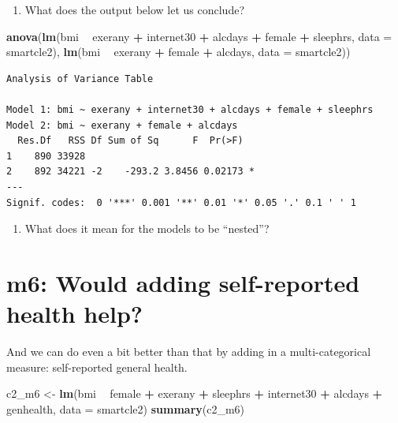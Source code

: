 \documentclass[]{book}
\newenvironment{Shaded}{\begin{snugshade}}{\end{snugshade}}
\newcommand{\KeywordTok}[1]{\textcolor[rgb]{0.13,0.29,0.53}{\textbf{#1}}}
\newcommand{\DataTypeTok}[1]{\textcolor[rgb]{0.13,0.29,0.53}{#1}}
\newcommand{\StringTok}[1]{\textcolor[rgb]{0.31,0.60,0.02}{#1}}
\newcommand{\OperatorTok}[1]{\textcolor[rgb]{0.81,0.36,0.00}{\textbf{#1}}}
\newcommand{\NormalTok}[1]{#1}
\providecommand{\tightlist}{%
  \setlength{\itemsep}{0pt}\setlength{\parskip}{0pt}}
\theoremstyle{definition}
\theoremstyle{definition}
\theoremstyle{definition}
\theoremstyle{remark}
\begin{document}
\begin{enumerate}
\def\labelenumi{\arabic{enumi}.}
\setcounter{enumi}{2}
\tightlist
\item
  What does the output below let us conclude?
\end{enumerate}

\begin{Shaded}
\begin{Highlighting}[]
\KeywordTok{anova}\NormalTok{(}\KeywordTok{lm}\NormalTok{(bmi }\OperatorTok{~}\StringTok{ }\NormalTok{exerany }\OperatorTok{+}\StringTok{ }\NormalTok{internet30 }\OperatorTok{+}\StringTok{ }\NormalTok{alcdays }\OperatorTok{+}\StringTok{ }\NormalTok{female }\OperatorTok{+}\StringTok{ }\NormalTok{sleephrs, }
         \DataTypeTok{data =}\NormalTok{ smartcle2),}
      \KeywordTok{lm}\NormalTok{(bmi }\OperatorTok{~}\StringTok{ }\NormalTok{exerany }\OperatorTok{+}\StringTok{ }\NormalTok{female }\OperatorTok{+}\StringTok{ }\NormalTok{alcdays, }
         \DataTypeTok{data =}\NormalTok{ smartcle2))}
\end{Highlighting}
\end{Shaded}

\begin{verbatim}
Analysis of Variance Table

Model 1: bmi ~ exerany + internet30 + alcdays + female + sleephrs
Model 2: bmi ~ exerany + female + alcdays
  Res.Df   RSS Df Sum of Sq      F  Pr(>F)  
1    890 33928                              
2    892 34221 -2    -293.2 3.8456 0.02173 *
---
Signif. codes:  0 '***' 0.001 '**' 0.01 '*' 0.05 '.' 0.1 ' ' 1
\end{verbatim}

\begin{enumerate}
\def\labelenumi{\arabic{enumi}.}
\setcounter{enumi}{3}
\tightlist
\item
  What does it mean for the models to be ``nested''?
\end{enumerate}

\section{m6: Would adding self-reported health
help?}\label{m6-would-adding-self-reported-health-help}

And we can do even a bit better than that by adding in a
multi-categorical measure: self-reported general health.

\begin{Shaded}
\begin{Highlighting}[]
\NormalTok{c2_m6 <-}\StringTok{ }\KeywordTok{lm}\NormalTok{(bmi }\OperatorTok{~}\StringTok{ }\NormalTok{female }\OperatorTok{+}\StringTok{ }\NormalTok{exerany }\OperatorTok{+}\StringTok{ }\NormalTok{sleephrs }\OperatorTok{+}\StringTok{ }\NormalTok{internet30 }\OperatorTok{+}\StringTok{ }\NormalTok{alcdays }\OperatorTok{+}\StringTok{ }\NormalTok{genhealth,}
         \DataTypeTok{data =}\NormalTok{ smartcle2)}
\KeywordTok{summary}\NormalTok{(c2_m6)}
\end{Highlighting}
\end{Shaded}
\end{document}
